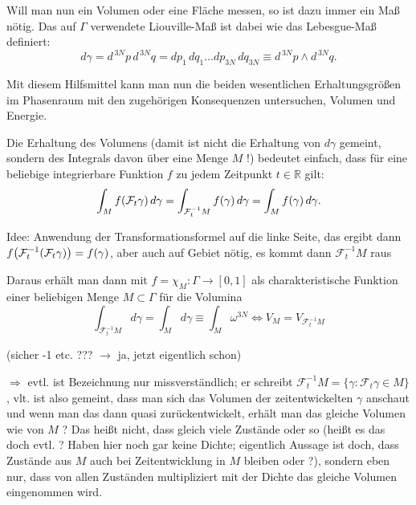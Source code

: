 \documentclass[../KlassMech_main.tex]{subfiles}
\begin{document}
Will man nun ein Volumen oder eine Fläche messen, so ist dazu immer ein Maß nötig. Das auf $\Gamma$ verwendete Liouville-Maß ist dabei wie das Lebesgue-Maß definiert:
\begin{equation}\label{key}
d\gamma = d^{\,3N}p \, d^{\,3N}q = dp_1 \, dq_1 \dots dp_{3N} \, dq_{3N} \equiv d^{\,3N}p \wedge d^{\,3N}q .
\end{equation}

Mit diesem Hilfsmittel kann man nun die beiden wesentlichen Erhaltungsgrößen im Phasenraum mit den zugehörigen Konsequenzen untersuchen, Volumen und Energie.

Die Erhaltung des Volumens (damit ist nicht die Erhaltung von $d\gamma$ gemeint, sondern des Integrals davon über eine Menge $M$ !) bedeutet einfach, dass für eine beliebige integrierbare Funktion $f$ zu jedem Zeitpunkt $t \in \mathbb{R}$ gilt:
\begin{equation}\label{eq:zeitentw}
\int_M f\qty(\mathcal{F}_t \gamma) \, d\gamma = \int_{\mathcal{F}_t^{-1} M} f\qty(\gamma) \, d\gamma = \int_M f(\gamma) \, d\gamma.
\end{equation}

Idee: Anwendung der Transformationsformel auf die linke Seite, das ergibt dann $f\qty(\mathcal{F}_t^{-1}(\mathcal{F}_t \gamma)) = f(\gamma)$, aber auch auf Gebiet nötig, es kommt dann $\mathcal{F}_t^{-1}M$ raus


Daraus erhält man dann mit $f = \chi_M: \Gamma \rightarrow [0,1]$ als charakteristische Funktion einer beliebigen Menge $M \subset \Gamma$ für die Volumina
\begin{equation}\label{key}
\int_{\mathcal{F}_t^{-1} M} d\gamma = \int_M d\gamma  \equiv \int_M \omega^{3N} \Leftrightarrow V_M = V_{\mathcal{F}_t^{-1}M}
\end{equation}

(sicher -1 etc. ??? $\rightarrow$ ja, jetzt eigentlich schon)

$\Rightarrow$ evtl. ist Bezeichnung nur missverständlich; er schreibt $\mathcal{F}_t^{-1}M = \{\gamma: \mathcal{F}_t \gamma \in M\}$, vlt. ist also gemeint, dass man sich das Volumen der zeitentwickelten $\gamma$ anschaut und wenn man das dann quasi zurückentwickelt, erhält man das gleiche Volumen wie von $M$ ? Das heißt nicht, dass gleich viele Zustände oder so (heißt es das doch evtl. ? Haben hier noch gar keine Dichte; eigentlich Aussage ist doch, dass Zustände aus $M$ auch bei Zeitentwicklung in $M$ bleiben oder ?), sondern eben nur, dass von allen Zuständen multipliziert mit der Dichte das gleiche Volumen eingenommen wird.
\end{document}
